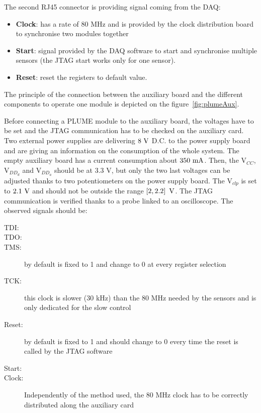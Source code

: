   The second RJ45 connector is providing signal coming from the DAQ:
  \begin{itemize}
    \item \textbf{Clock}: has a rate of 80 MHz and is provided by the clock distribution board to synchronise two modules together
    \item \textbf{Start}: signal provided by the DAQ software to start and synchronise multiple sensors (the JTAG start works only for one sensor).
    \item \textbf{Reset}: reset the registers to default value. 
  \end{itemize}

  The principle of the connection between the auxiliary board and the different components to operate one module is depicted on the figure~\ref{fig:plumeAux}.

  Before connecting a PLUME module to the auxiliary board, the voltages have to be set and the \gls{JTAG} communication has to be checked on the auxiliary card.
  Two external power supplies are delivering $8~\rm{V}$ D.C. to the power supply board and are giving an information on the consumption of the whole system.
  The empty auxiliary board has a current consumption about $350~\rm{mA}$.
  Then, the $\text{V}_{CC}$, $\text{V}_{DD_d}$ and $\text{V}_{DD_a}$ should be at 3.3 V, but only the two last voltages can be adjusted thanks to two potentiometers on the power supply board.
  The $\text{V}_{clp}$ is set to $2.1~\rm{V}$ and should not be outside the range $\left[2, 2.2\right]~\rm{V}$.
  The JTAG communication is verified thanks to a probe linked to an oscilloscope.
  The observed signals should be:

  \begin{description}
    \item[TDI:]
    \item[TDO:]
    \item[TMS:] by default is fixed to 1 and change to 0 at every register selection
    \item[TCK:] this clock is slower (30 kHz) than the 80 MHz needed by the sensors and is only dedicated for the slow control
    \item[Reset:] by default is fixed to 1 and should change to 0 every time the reset is called by the JTAG software
    \item[Start:] 
    \item[Clock:] Independently of the method used, the 80 MHz clock has to be correctly distributed along the auxiliary card
  \end{description}

